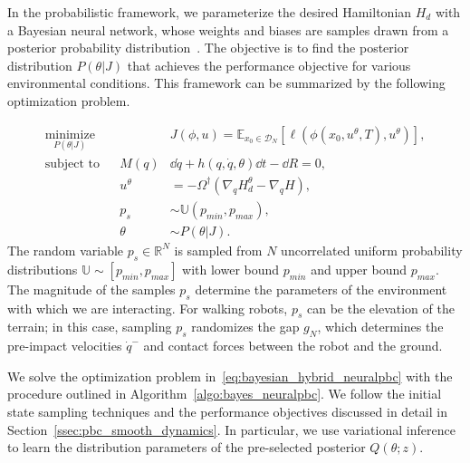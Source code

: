 In the probabilistic framework, we parameterize the desired Hamiltonian $H_d$
with a Bayesian neural network, whose weights and biases are samples drawn from
a posterior probability distribution~\cite{jospin2020hands}.
%
The objective is to find the posterior distribution $P(\theta |J)$ that achieves
the performance objective for various environmental conditions.
%
This framework can be summarized by the following optimization problem.

\begin{equation}
    \begin{aligned}
        \underset{P(\theta | J)}{\textrm{minimize}} 
        & & & J(\phi, u) = \mathbb{E}_{x_0 \in \mathcal{D}_N}[\ell(\phi(x_0, u^\theta, T), u^\theta)], \\
        \textrm{subject to}
        & & M(q) &\dd \dot{q} + h(q, \dot{q}, \theta)\dd t - \dd R  = 0,\\
        & & u^{\theta} &= -\Omega^{\dagger} (\nabla_q H_d^{\theta} - \nabla_q H), \\
        & & p_s &\sim \mathbb{U}(p_{min}, p_{max}), \\
        & & \theta &\sim P(\theta | J).
    \end{aligned}
    \label{eq:bayesian_hybrid_neuralpbc}
\end{equation}
\noindent The random variable $p_s \in \mathbb{R}^{N}$ is sampled from $N$
uncorrelated uniform probability distributions $\mathbb{U} \sim [p_{min}, p_{max}]$
with lower bound $p_{min}$ and upper bound $p_{max}$.
%
The magnitude of the samples $p_s$ determine the parameters of the environment
with which we are interacting. For walking robots, $p_s$ can be the elevation of
the terrain; in this case, sampling $p_s$ randomizes the gap $g_N$, which
determines the pre-impact velocities $\dot{q}^{-}$ and contact forces between
the robot and the ground.

We solve the optimization problem in~\eqref{eq:bayesian_hybrid_neuralpbc} with
the procedure outlined in Algorithm~\eqref{algo:bayes_neuralpbc}. 
%
We follow the initial state sampling techniques and the performance objectives
discussed in detail in Section~\ref{ssec:pbc_smooth_dynamics}. In particular, we
use variational inference to learn the distribution parameters of the
pre-selected posterior $Q(\theta;z)$.

